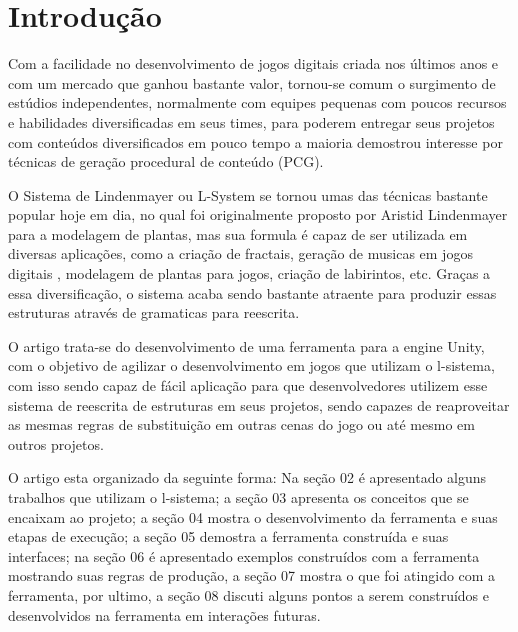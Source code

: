 \section{Introdução}
Com a facilidade no desenvolvimento de jogos digitais criada nos últimos anos e com um mercado que ganhou bastante valor, tornou-se comum o surgimento de estúdios independentes, normalmente com equipes pequenas com poucos recursos e habilidades diversificadas em seus times, para poderem entregar seus projetos com conteúdos diversificados em pouco tempo a maioria demostrou interesse por técnicas de geração procedural de conteúdo (PCG).

O Sistema de Lindenmayer ou L-System\cite{Prusinkiewicz} se tornou umas das técnicas bastante popular hoje em dia, no qual foi originalmente proposto por Aristid Lindenmayer para a modelagem de plantas, mas sua formula é capaz de ser utilizada em diversas aplicações, como a criação de fractais, geração de musicas em jogos digitais \cite{Fridenfalk} , modelagem de plantas para jogos, criação de labirintos, etc. Graças a essa diversificação, o sistema acaba sendo bastante atraente para produzir essas estruturas através de gramaticas para reescrita.

O artigo trata-se do desenvolvimento de uma ferramenta para a engine Unity, com o objetivo de agilizar o desenvolvimento em jogos que utilizam o l-sistema, com isso sendo capaz de fácil aplicação para que desenvolvedores utilizem esse sistema de reescrita de estruturas em seus projetos, sendo capazes de reaproveitar as mesmas regras de substituição em outras cenas do jogo ou até mesmo em outros projetos.

O artigo esta organizado da seguinte forma: Na seção 02 é apresentado alguns trabalhos que utilizam o l-sistema; a seção 03 apresenta os conceitos que se encaixam ao projeto; a seção 04 mostra o desenvolvimento da ferramenta e suas etapas de execução; a seção 05 demostra a ferramenta construída e suas interfaces; na seção 06 é apresentado exemplos construídos com a ferramenta mostrando suas regras de produção, a seção 07 mostra o que foi atingido com a ferramenta, por ultimo, a seção 08 discuti alguns pontos a serem construídos e desenvolvidos na ferramenta em interações futuras.